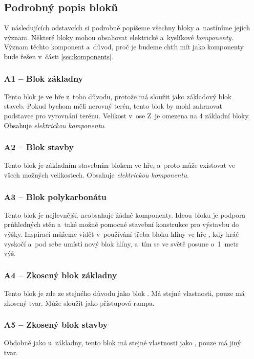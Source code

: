 \FloatBarrier


\subsection{Podrobný popis bloků}

V následujících odstavcích si podrobně popíšeme všechny bloky a~nastíníme jejich význam. Některé bloky mohou obsahovat elektrické a~kyslíkové \textit{komponenty}. Význam těchto komponent a~důvod, proč je budeme chtít mít jako komponenty bude řešen v~části \ref{sec:komponents}.



\subsubsection{A1 -- Blok základny}
\label{blocks:A1}
Tento blok je ve hře z~toho důvodu, protože má sloužit jako základový blok staveb. Pokud bychom měli nerovný terén, tento blok by mohl zahrnovat podstavce pro vyrovnání terénu. Velikost v~ose Z~je omezena na 4 základní bloky. Obsahuje \textit{elektrickou komponentu}.


\subsubsection{A2 -- Blok stavby}
\label{blocks:A2}
Tento blok je základním stavebním blokem ve hře, a~proto může existovat ve všech možných velikostech. Obsahuje \textit{elektrickou komponentu}.


\subsubsection{A3 -- Blok polykarbonátu}
\label{blocks:A3}
Tento blok je nejlevnější, neobsahuje žádné komponenty. Ideou bloku je podpora průhledných stěn a~také možné pomocné stavební konstrukce pro výstavbu do výšky. Inspiraci můžeme vidět v~používání třeba bloku hlíny ve hře \MC{}, kdy hráč vyskočí a~pod sebe umístí nový blok hlíny, a~tím se ve světě posune o~1~metr výš.


\subsubsection{A4 -- Zkosený blok základny}
\label{blocks:A4}
Tento blok je zde ze stejného důvodu jako blok . Má stejné vlastnosti, pouze má zkosený tvar. Může sloužit jako přístupová rampa.


\subsubsection{A5 -- Zkosený blok stavby}
\label{blocks:A5}
Obdobně jako u~základny, tento blok má stejné vlastnosti jako , pouze má jiný tvar.


